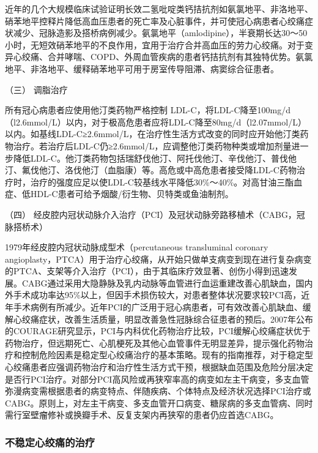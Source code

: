 近年的几个大规模临床试验证明长效二氢吡啶类钙拮抗剂如氨氯地平、非洛地平、硝苯地平控释片降低高血压患者的死亡率及心脏事件，并可使冠心病患者心绞痛症状减少、冠脉造影及搭桥病例减少。氨氯地平（amlodipine），半衰期长达30～50小时，无短效硝苯地平的不良作用，宜用于治疗合并高血压的劳力心绞痛。对于变异心绞痛、合并哮喘、COPD、外周血管疾病的患者钙拮抗剂有其独特优势。氨氯地平、非洛地平、缓释硝苯地平可用于房室传导阻滞、病窦综合征患者。

\hypertarget{text00309.htmlux5cux23CHP10-7-3-1-3}{}
（三） 调脂治疗

所有冠心病患者应使用他汀类药物严格控制
LDL-C，将LDL-C降至100mg/d（l2.6mmol/L）以内，对于极高危患者应将LDL-C降至80mg/d（l2.07mmol/L）以内。如基线LDL-C≥2.6mmol/L，在治疗性生活方式改变的同时应开始他汀类药物治疗。若治疗后LDL-C仍≥2.6mmol/L，应调整他汀类药物种类或增加剂量进一步降低LDL-C。他汀类药物包括瑞舒伐他汀、阿托伐他汀、辛伐他汀、普伐他汀、氟伐他汀、洛伐他汀（血脂康）等。高危或中高危患者接受降LDL-C药物治疗时，治疗的强度应足以使LDL-C较基线水平降低30\%～40\%。对高甘油三酯血症、低HDL-C患者可给予烟酸/衍生物、贝特类或鱼油制剂。

\hypertarget{text00309.htmlux5cux23CHP10-7-3-1-4}{}
（四）
经皮腔内冠状动脉介入治疗（PCI）及冠状动脉旁路移植术（CABG，冠脉搭桥术）

1979年经皮腔内冠状动脉成型术（percutaneous transluminal coronary
angioplasty，PTCA）用于治疗心绞痛，从开始只做单支病变到现在进行复杂病变的PTCA、支架等介入治疗（PCI），由于其临床疗效显著、创伤小得到迅速发展。CABG通过采用大隐静脉及乳内动脉等血管进行血运重建改善心肌缺血，国内外手术成功率达95\%以上，但因手术损伤较大，对患者整体状况要求较PCI高，近年手术病例有所减少。近年PCI的广泛用于冠心病患者，可有效改善心肌缺血、缓解心绞痛症状，改善生活质量，明显改善急性冠脉综合征患者的预后。2007年公布的COURAGE研究显示，PCI与内科优化药物治疗比较，PCI缓解心绞痛症状优于药物治疗，但远期死亡、心肌梗死及其他心血管事件无明显差异，提示强化药物治疗和控制危险因素是稳定型心绞痛治疗的基本策略。现有的指南推荐，对于稳定型心绞痛患者应强调药物治疗和治疗性生活方式干预，根据缺血范围及危险分层决定是否行PCI治疗。对部分PCI高风险或再狭窄率高的病变如左主干病变，多支血管弥漫病变需根据患者的病变特点、伴随疾病、个体特点及经济状况选择PCI治疗或CABG。原则上，对左主干病变、多支血管开口病变、糖尿病的多支血管病、同时需行室壁瘤修补或换瓣手术、反复支架内再狭窄的患者仍应首选CABG。

\subsubsection{不稳定心绞痛的治疗}

